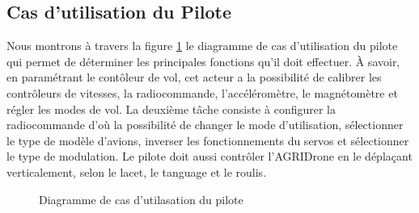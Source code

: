 			\subsection{Cas d'utilisation du Pilote}
			Nous montrons à travers la figure \ref{fig:D.P} le diagramme de cas d'utilisation du pilote qui permet de déterminer les principales fonctions qu'il doit effectuer. À savoir, en paramétrant le contôleur de vol, cet acteur a la possibilité de calibrer les contrôleurs de vitesses, la radiocommande, l'accéléromètre, le magnétomètre et régler les modes de vol. La deuxième tâche consiste à configurer la radiocommande d'où la possibilité de changer le mode d'utilisation, sélectionner le type de modèle d'avions, inverser les fonctionnements du servos et sélectionner le type de modulation. Le pilote doit aussi contrôler l'AGRIDrone en le déplaçant verticalement, selon le lacet, le tanguage et le roulis.
			\begin {figure}[H] 
			\begin{center} 
				\centering
		\hspace*{-0.1cm}		
			\end{center}
			
			\caption{\label{fig:D.P}Diagramme de cas d'utilasation du pilote}
			\end {figure}
			
		
